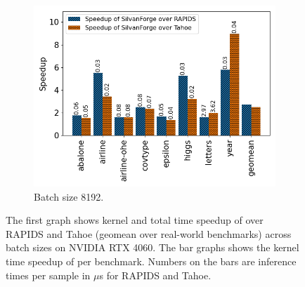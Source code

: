 \begin{figure}[htb]
\begin{subfigure}[t]{.32\linewidth}
      \includegraphics[width=\textwidth]{figures/speedup_bar_graph_8192.png}
      \caption{\label{Fig:KernelTimeIndividualBenchmarks4060b} Batch size 8192.}
    \end{subfigure}
    \caption{The first graph shows kernel and total time speedup of \Treebeard{} over RAPIDS and Tahoe (geomean over real-world 
    benchmarks) across batch sizes on NVIDIA RTX 4060. The bar graphs shows the kernel time speedup of \Treebeard{} per benchmark. Numbers on the bars are inference times per sample in $\mu$s for RAPIDS and Tahoe.}
\end{figure}




